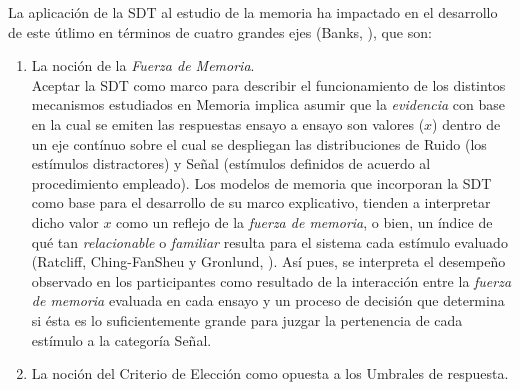 La aplicación de la SDT al estudio de la memoria ha impactado en el desarrollo de este útlimo en términos de cuatro grandes ejes (Banks, \citeyear{Banks1970}), que son:\\

\begin{enumerate}
\item La noción de la \textit{Fuerza de Memoria}.\\

Aceptar la SDT como marco para describir el funcionamiento de los distintos mecanismos estudiados en Memoria implica asumir que la \textit{evidencia} con base en la cual se emiten las respuestas ensayo a ensayo son valores ($x$) dentro de un eje contínuo sobre el cual se despliegan las distribuciones de Ruido (los estímulos distractores) y Señal (estímulos definidos de acuerdo al procedimiento empleado). Los modelos de memoria que incorporan la SDT como base para el desarrollo de su marco explicativo, tienden a interpretar dicho valor $x$ como un reflejo de la \textit{fuerza de memoria}, o bien, un índice de qué tan \textit{relacionable} o \textit{familiar} resulta para el sistema cada estímulo evaluado (Ratcliff, Ching-FanSheu y Gronlund, \citeyear{Ratcliff1992}). Así pues, se interpreta el desempeño observado en los participantes como resultado de la interacción entre la \textit{fuerza de memoria} evaluada en cada ensayo y un proceso de decisión que determina si ésta es lo suficientemente grande para juzgar la pertenencia de cada estímulo a la categoría Señal.\\


\item La noción del Criterio de Elección como opuesta a los Umbrales de respuesta.\\


\end{enumerate}
